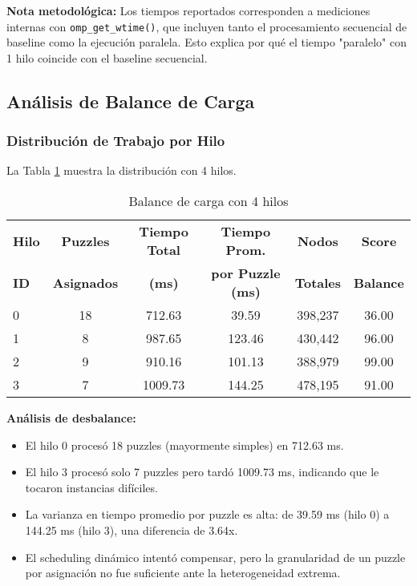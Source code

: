 \documentclass[12pt,a4paper]{article}
\begin{document}
\textbf{Nota metodológica:} Los tiempos reportados corresponden a mediciones internas con \texttt{omp\_get\_wtime()}, que incluyen tanto el procesamiento secuencial de baseline como la ejecución paralela. Esto explica por qué el tiempo "paralelo" con 1 hilo coincide con el baseline secuencial.

\subsection{Análisis de Balance de Carga}

\subsubsection{Distribución de Trabajo por Hilo}

La Tabla \ref{tab:load_balance_4} muestra la distribución con 4 hilos.

\begin{table}[H]
\centering
\caption{Balance de carga con 4 hilos}
\label{tab:load_balance_4}
\begin{tabular}{@{}lccccc@{}}
\toprule
\textbf{Hilo} & \textbf{Puzzles} & \textbf{Tiempo Total} & \textbf{Tiempo Prom.} & \textbf{Nodos} & \textbf{Score} \\
\textbf{ID} & \textbf{Asignados} & \textbf{(ms)} & \textbf{por Puzzle (ms)} & \textbf{Totales} & \textbf{Balance} \\
\midrule
0 & 18 & 712.63 & 39.59 & 398,237 & 36.00 \\
1 & 8 & 987.65 & 123.46 & 430,442 & 96.00 \\
2 & 9 & 910.16 & 101.13 & 388,979 & 99.00 \\
3 & 7 & 1009.73 & 144.25 & 478,195 & 91.00 \\
\bottomrule
\end{tabular}
\end{table}

\textbf{Análisis de desbalance:}

\begin{itemize}
    \item El hilo 0 procesó 18 puzzles (mayormente simples) en 712.63 ms.
    \item El hilo 3 procesó solo 7 puzzles pero tardó 1009.73 ms, indicando que le tocaron instancias difíciles.
    \item La varianza en tiempo promedio por puzzle es alta: de 39.59 ms (hilo 0) a 144.25 ms (hilo 3), una diferencia de 3.64x.
    \item El scheduling dinámico intentó compensar, pero la granularidad de un puzzle por asignación no fue suficiente ante la heterogeneidad extrema.
\end{itemize}
\end{document}
